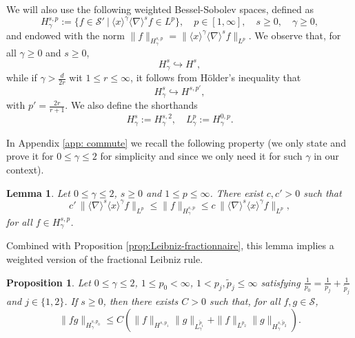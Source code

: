 \documentclass[12pt]{article}
\theoremstyle{plain}
\newtheorem{prop}[theo]{Proposition}
\newtheorem{lemma}[theo]{Lemma}
\begin{document}
We will also use the following weighted Bessel-Sobolev spaces, defined as
\begin{equation}\label{eq:def_Hsgamma0}
    H^{s,p}_\gamma := \{ f \in \mathcal{S}' \ |\ \langle x\rangle^\gamma \langle \nabla \rangle^sf \in L^p\}, \quad p \in [1, \infty], \quad s\geq 0, \quad \gamma\ge0,
\end{equation}
and endowed with the norm $\|f\|_{H^{s,p}_\gamma} = \|\langle x\rangle^\gamma \langle \nabla \rangle^sf\|_{L^p}$. We observe that, for all $\gamma\ge0$ and $s\ge0$,
\begin{equation*}
    H^s_\gamma\hookrightarrow H^s,
\end{equation*}
while if $\gamma>\frac{d}{2r}$ wit $1\le r\le\infty$, it follows from H\"older's inequality that 
\begin{equation*}
    H^s_\gamma\hookrightarrow H^{s,p'},
\end{equation*}
with $p'=\frac{2r}{r+1}$.
We also define the shorthands 
\begin{equation}\label{eq:def_Hsgamma}
    H^s_\gamma:= H^{s,2}_\gamma, \quad L^p_\gamma := H^{0,p}_\gamma.
\end{equation}



In Appendix \ref{app: commute} we recall the following property (we only state and prove it for $0\le\gamma\le2$ for simplicity and since we only need it for such $\gamma$ in our context). 
\begin{lemma}
\label{lemma: weight sob norm}
     Let $0\leq \gamma\leq 2$,  $s\geq 0$ and $1\leq p \leq \infty$. There exist $c, c'>0$ such that 
 \begin{equation*}
    c'\,  \| \langle \nabla \rangle^s \langle x \rangle^\gamma f \|_{L^p} \leq \|f\|_{  H^{s,p}_\gamma } \leq c\,  \| \langle \nabla \rangle^s \langle x \rangle^\gamma f \|_{L^p} ,
 \end{equation*}
 for all $f\in H^{s,p}_\gamma$.
\end{lemma}
Combined with Proposition \ref{prop:Leibniz-fractionnaire}, this lemma implies a weighted version of the fractional Leibniz rule. 
\begin{prop}
\label{prop:weighted leibniz}
    Let $0\leq \gamma\leq 2$, $1\leq p_0<\infty$, $1<p_j,\tilde{p}_j\leq\infty$ satisfying $\frac{1}{p_0}=\frac{1}{p_j}+\frac{1}{\tilde{p}_j}$ and $j\in\{1,2\}$. If $s\geq 0$, then there exists $C>0$ such that, for all $f,g\in\mathcal{S}$,
    \begin{equation*}
        \|fg\|_{H^{s,p_0}_\gamma} \leq C ( \|f \|_{H^{s,p_1}} \| g \|_{L_\gamma^{\tilde{p}_1}} + \|f\|_{L^{p_2}}\| g\|_{H_\gamma^{s,\tilde{p}_2}}) .
    \end{equation*}
\end{prop}
\end{document}
